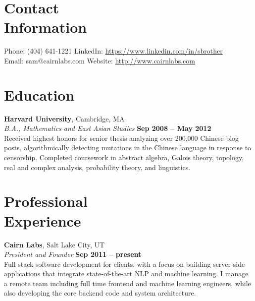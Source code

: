 \documentclass[margin,line]{resume}
\begin{document}
\begin{resume}
    \section{\mysidestyle Contact\\Information}

    Phone: (404) 641-1221       \hfill LinkedIn: \url{https://www.linkedin.com/in/sbrother} \\
    \noindent Email: sam@cairnlabs.com  \hfill Website: \url{http://www.cairnlabs.com} \vspace{0mm}\\\vspace{-4.5mm}

    \section{\mysidestyle Education}

    \textbf{Harvard University}, Cambridge, MA \vspace{2mm}\\\vspace{1mm}%
    \textsl{B.A., Mathematics and East Asian Studies} \hfill \textbf{Sep 2008 -- May 2012}\\
    Received highest honors for senior thesis analyzing over 200,000 Chinese
    blog posts, algorithmically detecting mutations in the Chinese language in
    response to censorship. Completed coursework in abstract algebra,
    Galois theory, topology, real and complex analysis, probability theory, and
    linguistics.

    \section{\mysidestyle Professional\\Experience}

    \textbf{Cairn Labs}, Salt Lake City, UT \vspace{2mm}\\\vspace{1mm}%
    \textsl{President and Founder} \hfill \textbf{Sep 2011 -- present}\\
    Full stack software development for clients, with a focus on building
    server-side applications that integrate state-of-the-art NLP and
    machine learning. I manage a remote team including full time frontend
    and machine learning engineers, while also developing the core backend
    code and system architecture.


\end{resume}
\end{document}
